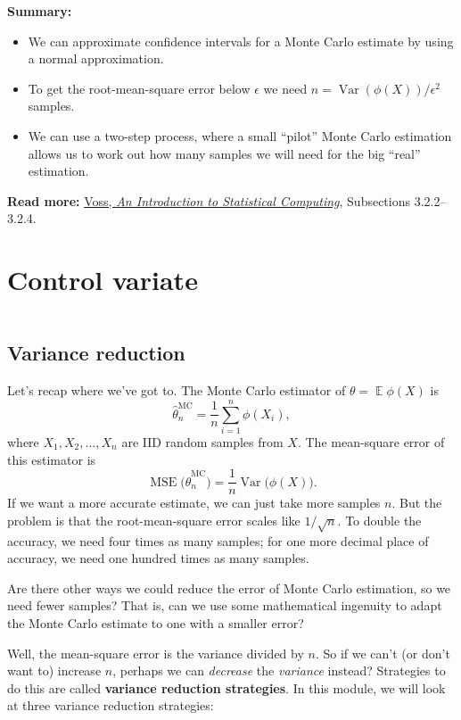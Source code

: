 \documentclass[
  letterpaper,
  DIV=11,
  numbers=noendperiod]{scrreprt}
\newcommand{\Exg}{\operatorname{\mathbb{E}}}
\newcommand{\Var}{\operatorname{Var}}
\theoremstyle{plain}
\theoremstyle{definition}
\theoremstyle{definition}
\theoremstyle{remark}
\begin{document}
\textbf{Summary:}

\begin{itemize}
\item
  We can approximate confidence intervals for a Monte Carlo estimate by
  using a normal approximation.
\item
  To get the root-mean-square error below \(\epsilon\) we need
  \(n = \Var(\phi(X))/\epsilon^2\) samples.
\item
  We can use a two-step process, where a small ``pilot'' Monte Carlo
  estimation allows us to work out how many samples we will need for the
  big ``real'' estimation.
\end{itemize}

\textbf{Read more:}
\href{https://leeds.primo.exlibrisgroup.com/permalink/44LEE_INST/1fj430b/cdi_askewsholts_vlebooks_9781118728031}{Voss,
\emph{An Introduction to Statistical Computing}}, Subsections
3.2.2--3.2.4.

\chapter{Control variate}\label{control-variate}

\[ \]

\section{Variance reduction}\label{variance-reduction}

Let's recap where we've got to. The Monte Carlo estimator of
\(\theta = \Exg \phi(X)\) is
\[ \widehat{\theta}_n^{\mathrm{MC}} = \frac{1}{n} \sum_{i=1}^n \phi(X_i), \]
where \(X_1, X_2, \dots, X_n\) are IID random samples from \(X\). The
mean-square error of this estimator is
\[{\displaystyle \operatorname{MSE}\big(\widehat{\theta}_n^{\mathrm{MC}}\big) = \frac{1}{n} \operatorname{Var}\big(\phi(X)\big)} . \]
If we want a more accurate estimate, we can just take more samples
\(n\). But the problem is that the root-mean-square error scales like
\(1/\sqrt{n}\). To double the accuracy, we need four times as many
samples; for one more decimal place of accuracy, we need one hundred
times as many samples.

Are there other ways we could reduce the error of Monte Carlo
estimation, so we need fewer samples? That is, can we use some
mathematical ingenuity to adapt the Monte Carlo estimate to one with a
smaller error?

Well, the mean-square error is the variance divided by \(n\). So if we
can't (or don't want to) increase \(n\), perhaps we can \emph{decrease}
the \emph{variance} instead? Strategies to do this are called
\textbf{variance reduction strategies}. In this module, we will look at
three variance reduction strategies:
\end{document}
